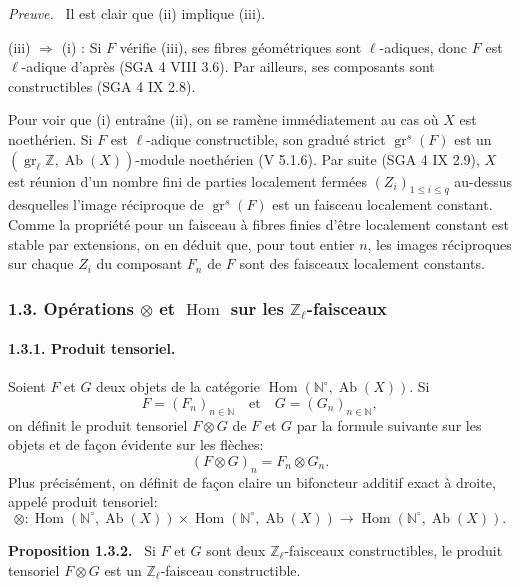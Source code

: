 \documentclass[11pt]{article}
\newenvironment{statement}[1]{\par\medskip\noindent\textbf{#1.}\ }{\par\medskip}
\newenvironment{prooftext}[1][Proof]{\par\noindent\emph{#1.}\ }{\par\medskip}
\DeclareMathOperator{\Hom}{Hom}
\providecommand{\Hom}{\operatorname{Hom}}
\providecommand{\Ab}{\operatorname{Ab}}
\providecommand{\Ab}{\operatorname{Ab}}
\providecommand{\Hom}{\operatorname{Hom}}
\begin{document}
\begin{prooftext}[Preuve]
Il est clair que (ii) implique (iii).

(iii) \(\Longrightarrow\) (i) : Si \(F\) vérifie (iii), ses fibres géométriques sont \(\ell\)-adiques, donc \(F\) est \(\ell\)-adique d'après (SGA 4 VIII 3.6). Par ailleurs, ses composants sont constructibles (SGA 4 IX 2.8).

Pour voir que (i) entraîne (ii), on se ramène immédiatement au cas où \(X\) est noethérien. Si \(F\) est \(\ell\)-adique constructible, son gradué strict \(\operatorname{gr}^s(F)\) est un \((\operatorname{gr}_\ell\mathbb Z,\Ab(X))\)-module noethérien (V 5.1.6). Par suite (SGA 4 IX 2.9), \(X\) est réunion d'un nombre fini de parties localement fermées \((Z_i)_{1\le i\le q}\) au-dessus desquelles l'image réciproque de \(\operatorname{gr}^s(F)\) est un faisceau localement constant. Comme la propriété pour un faisceau à fibres finies d'être localement constant est stable par extensions, on en déduit que, pour tout entier \(n\), les images réciproques sur chaque \(Z_i\) du composant \(F_n\) de \(F\) sont des faisceaux localement constants.
\end{prooftext}

\subsubsection*{1.3. Opérations \(\otimes\) et \(\Hom\) sur les \(\mathbb Z_\ell\)-faisceaux}

\paragraph{1.3.1. Produit tensoriel.}
Soient \(F\) et \(G\) deux objets de la catégorie \(\Hom(\mathbb N^\circ,\Ab(X))\). Si
\[
F=(F_n)_{n\in\mathbb N}\quad\text{et}\quad G=(G_n)_{n\in\mathbb N},
\]
on définit le produit tensoriel \(F\otimes G\) de \(F\) et \(G\) par la formule suivante sur les objets et de façon évidente sur les flèches:
\[
(F\otimes G)_n=F_n\otimes G_n.
\]
Plus précisément, on définit de façon claire un bifoncteur additif exact à droite, appelé produit tensoriel:
\[
\otimes:\Hom(\mathbb N^\circ,\Ab(X))\times \Hom(\mathbb N^\circ,\Ab(X))
\longrightarrow \Hom(\mathbb N^\circ,\Ab(X)).
\]

\begin{statement}{Proposition 1.3.2}
Si \(F\) et \(G\) sont deux \(\mathbb Z_\ell\)-faisceaux constructibles, le produit tensoriel \(F\otimes G\) est un \(\mathbb Z_\ell\)-faisceau constructible.
\end{statement}
\end{document}
